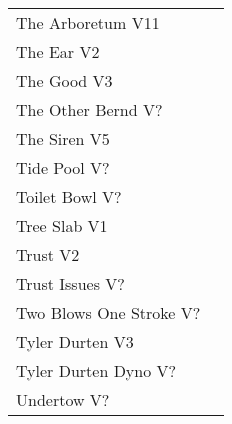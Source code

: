 \begin{center}
\begin{supertabular}{lr}
The Arboretum V11 & \pageref{rt:The Arboretum} \\
The Ear V2 & \pageref{rt:The Ear} \\
The Good V3 & \pageref{rt:The Good} \\
The Other Bernd V? & \pageref{rt:The Other Bernd} \\
The Siren V5 & \pageref{rt:The Siren} \\
Tide Pool V? & \pageref{rt:Tide Pool} \\
Toilet Bowl V? & \pageref{rt:Toilet Bowl} \\
Tree Slab V1 & \pageref{rt:Tree Slab} \\
Trust V2 & \pageref{rt:Trust} \\
Trust Issues V? & \pageref{rt:Trust Issues} \\
Two Blows One Stroke V? & \pageref{rt:Two Blows One Stroke} \\
Tyler Durten V3 & \pageref{rt:Tyler Durten} \\
Tyler Durten Dyno V? & \pageref{vr:Tyler Durten Dyno} \\
Undertow V? & \pageref{rt:Undertow} \\
\end{supertabular}
\end{center}
